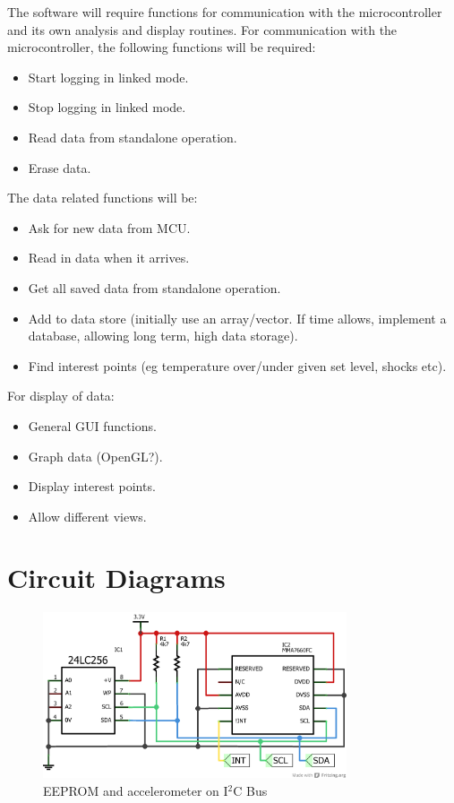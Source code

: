 \documentclass[a4paper,11pt]{article}  %
\begin{document}
The software will require functions for communication with the
microcontroller and its own analysis and display routines. For
communication with the microcontroller, the following functions
will be required:
\begin{itemize}
  \item Start logging in linked mode.
  \item Stop logging in linked mode.
  \item Read data from standalone operation.
  \item Erase data.
\end{itemize}
The data related functions will be:
\begin{itemize}
  \item Ask for new data from MCU.
  \item Read in data when it arrives.
  \item Get all saved data from standalone operation.
  \item Add to data store (initially use an array/vector. If time
    allows, implement a database, allowing long term, high data
    storage).
  \item Find interest points (eg temperature over/under given set
    level, shocks etc).
\end{itemize}
For display of data:
\begin{itemize}
  \item General GUI functions.
  \item Graph data (OpenGL?).
  \item Display interest points.
  \item Allow different views.
\end{itemize}

\newpage
\appendix

\section{Circuit Diagrams}
\label{sec:circuit-diagrams}

\begin{figure}[!h]
  \begin{center}
    \includegraphics[width=0.8\textwidth]{i2c_schem.png}
  \end{center}
  \caption{EEPROM and accelerometer on I$^2$C Bus}
  \label{fig:i2cbus}
\end{figure}
\end{document}
